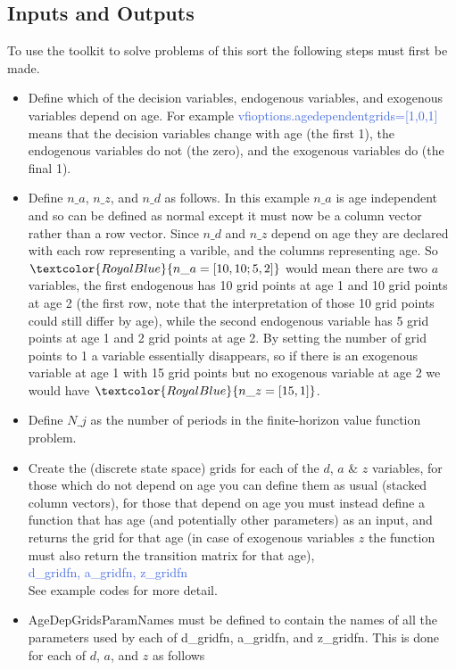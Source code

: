 \subsection{Inputs and Outputs}
To use the toolkit to solve problems of this sort the following steps must first be made.
\begin{itemize}
 \item Define which of the decision variables, endogenous variables, and exogenous variables depend on age. For example \textcolor{RoyalBlue}{vfioptions.agedependentgrids=[1,0,1]} means that the decision variables change with age (the first 1), the endogenous variables do not (the zero), and the exogenous variables do (the final 1).
 \item Define $n\_{}a$, $n\_{}z$, and $n\_{}d$ as follows. In this example $n\_{}a$ is age independent and so can be defined as normal except it must now be a column vector rather than a row vector. Since $n\_{}d$ and $n\_{}z$ depend on age they are declared with each row representing a varible, and the columns representing age. So $\textcolor{RoyalBlue}{n\_{}a=[10,10; 5,2]}$ would mean there are two $a$ variables, the first endogenous has 10 grid points at age 1 and 10 grid points at age 2 (the first row, note that the interpretation of those 10 grid points could still differ by age), while the second endogenous variable has 5 grid points at age 1 and 2 grid points at age 2. By setting the number of grid points to 1 a variable essentially disappears, so if there is an exogenous variable at age 1 with 15 grid points but no exogenous variable at age 2 we would have $\textcolor{RoyalBlue}{n\_{}z=[15,1]}$.
 \item Define $N\_{}j$ as the number of periods in the finite-horizon value function problem.
 \item Create the (discrete state space) grids for each of the $d$, $a$ \& $z$ variables, for those which do not depend on age you can define them as usual (stacked column vectors), for those that depend on age you must instead define a function that has age (and potentially other parameters) as an input, and returns the grid for that age (in case of exogenous variables $z$ the function must also return the transition matrix for that age), \\
    \textcolor{RoyalBlue}{d\_{}gridfn, a\_{}gridfn, z\_{}gridfn} \\
       See example codes for more detail.
 \item AgeDepGridsParamNames must be defined to contain the names of all the parameters used by each of d\_{}gridfn, a\_{}gridfn, and z\_{}gridfn. This is done for each of $d$, $a$, and $z$ as follows  \\

\end{itemize}
